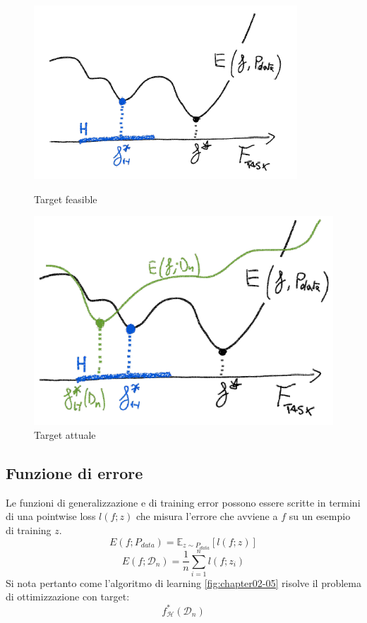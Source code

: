 	\begin{figure}
		\centering
		\begin{minipage}{.5\textwidth}
			\centering
			\includegraphics[width=1\linewidth]{imgs/chapter2/img3}
			\caption{Target feasible}
			\label{fig:chapter02-03}
		\end{minipage}%
		\begin{minipage}{.5\textwidth}
			\centering
			\includegraphics[width=1\linewidth]{imgs/chapter2/img4}
			\caption{Target attuale}
			\label{fig:chapter02-04}
		\end{minipage}
	\end{figure}
	
	\subsection{Funzione di errore}
	Le funzioni di generalizzazione e di training error possono essere scritte in termini di una pointwise loss $l(f;z)$ che misura l'errore che avviene a $f$ su un esempio di training $z$.
	$$E(f;P_{data})=\mathbb{E}_{z\sim P_{data}}[l(f;z)]$$
	$$E(f;\mathcal{D}_n)=\dfrac{1}{n}\sum\limits_{i=1}^nl(f;z_i)$$
	Si nota pertanto come l'algoritmo di learning \ref{fig:chapter02-05} risolve il problema di ottimizzazione con target:
	$$f^*_\mathcal{H}(\mathcal{D}_n)$$
	
